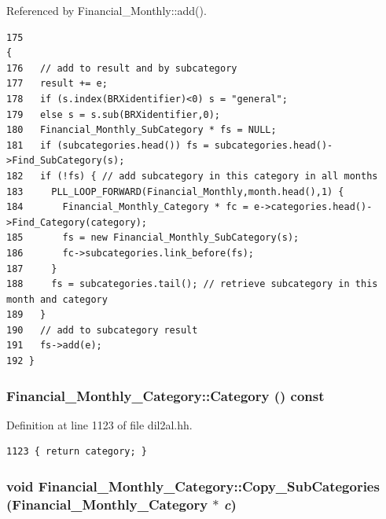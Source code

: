 Referenced by Financial\_\-Monthly::add().



\footnotesize\begin{verbatim}175                                                                                   {
176   // add to result and by subcategory
177   result += e;
178   if (s.index(BRXidentifier)<0) s = "general";
179   else s = s.sub(BRXidentifier,0);
180   Financial_Monthly_SubCategory * fs = NULL;
181   if (subcategories.head()) fs = subcategories.head()->Find_SubCategory(s);
182   if (!fs) { // add subcategory in this category in all months
183     PLL_LOOP_FORWARD(Financial_Monthly,month.head(),1) {
184       Financial_Monthly_Category * fc = e->categories.head()->Find_Category(category);
185       fs = new Financial_Monthly_SubCategory(s);
186       fc->subcategories.link_before(fs);
187     }
188     fs = subcategories.tail(); // retrieve subcategory in this month and category
189   }
190   // add to subcategory result
191   fs->add(e);
192 }
\end{verbatim}\normalsize 
{}
\subsubsection{ Financial\_\-Monthly\_\-Category::Category () const\hspace{0.3cm}{\tt  [inline]}}\label{classFinancial__Monthly__Category_a1}




Definition at line 1123 of file dil2al.hh.



\footnotesize\begin{verbatim}1123 { return category; }
\end{verbatim}\normalsize 
{}
\subsubsection{\setlength{\rightskip}{0pt plus 5cm}void Financial\_\-Monthly\_\-Category::Copy\_\-Sub\-Categories (Financial\_\-Monthly\_\-Category $\ast$ {\em c})}\label{classFinancial__Monthly__Category_a4}




